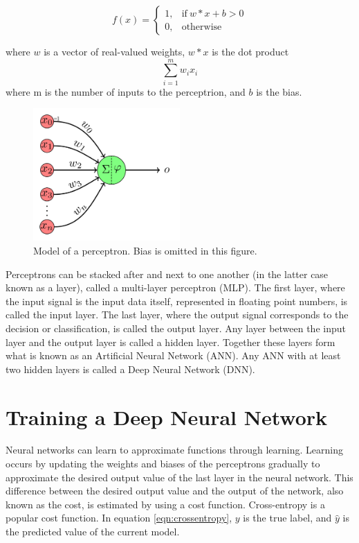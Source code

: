 \documentclass[english, bibtex]{kththesis}
\begin{document}
\begin{equation}
	f(x) = 
	    \begin{cases}
	      1, & \text{if}\ w * x + b > 0 \\
	      0, & \text{otherwise}
	    \end{cases}
  	\label{eqn:perceptron}
\end{equation}

where $w$ is a vector of real-valued weights, $w * x$ is the dot product \[\sum_{i=1}^{m} w_i x_i\] where m is the number of inputs to the perceptrion, and $b$ is the bias.

\begin{figure}[H]
  \begin{center}
    \includegraphics[width=0.5\textwidth]{figures/perceptron.png}
  \end{center}
  \caption{Model of a perceptron. Bias is omitted in this figure.}
  \label{fig:perceptron}
\end{figure}

Perceptrons can be stacked after and next to one another (in the latter case known as a layer), called a multi-layer perceptron (MLP). The first layer, where the input signal is the input data itself, represented in floating point numbers, is called the input layer. The last layer, where the output signal corresponds to the decision or classification, is called the output layer. Any layer between the input layer and the output layer is called a hidden layer. Together these layers form what is known as an Artificial Neural Network (ANN). Any ANN with at least two hidden layers is called a Deep Neural Network (DNN).



\section{Training a Deep Neural Network}

Neural networks can learn to approximate functions through learning. Learning occurs by updating the weights and biases of the perceptrons gradually to approximate the desired output value of the last layer in the neural network. This difference between the desired output value and the output of the network, also known as the cost, is estimated by using a cost function. Cross-entropy is a popular cost function. In equation \ref{eqn:crossentropy}, \(y\) is the true label, and \(\hat{y}\) is the predicted value of the current model.
\end{document}
